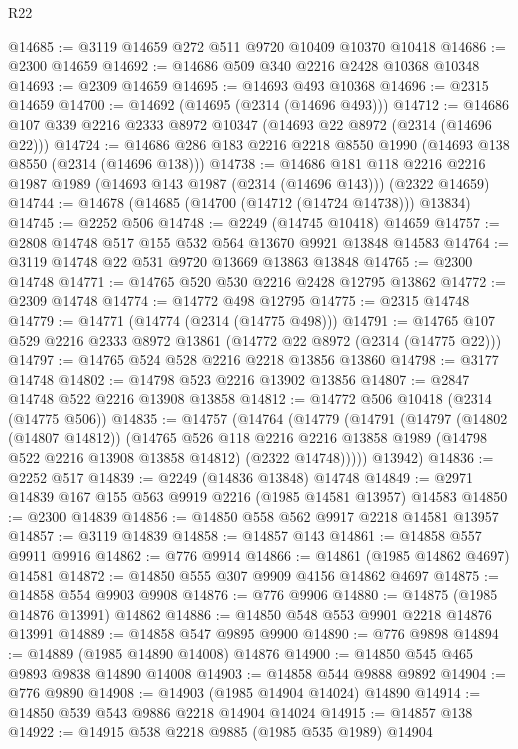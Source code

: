 \begin{lexlean}{R22}
\begin{coremodule}
@14685 := @3119 @14659 @272 @511 @9720 @10409 @10370 @10418
@14686 := @2300 @14659
@14692 := @14686 @509 @340 @2216 @2428 @10368 @10348
@14693 := @2309 @14659
@14695 := @14693 @493 @10368
@14696 := @2315 @14659
@14700 := @14692 (@14695 (@2314 (@14696 @493)))
@14712 := @14686 @107 @339 @2216 @2333 @8972 @10347 (@14693 @22 @8972 (@2314 (@14696 @22)))
@14724 := @14686 @286 @183 @2216 @2218 @8550 @1990 (@14693 @138 @8550 (@2314 (@14696 @138)))
@14738 := @14686
    @181
    @118
    @2216
    @2216
    @1987
    @1989
    (@14693 @143 @1987 (@2314 (@14696 @143)))
    (@2322 @14659)
@14744 := @14678 (@14685 (@14700 (@14712 (@14724 @14738))) @13834)
@14745 := @2252 @506
@14748 := @2249 (@14745 @10418) @14659
@14757 := @2808 @14748 @517 @155 @532 @564 @13670 @9921 @13848 @14583
@14764 := @3119 @14748 @22 @531 @9720 @13669 @13863 @13848
@14765 := @2300 @14748
@14771 := @14765 @520 @530 @2216 @2428 @12795 @13862
@14772 := @2309 @14748
@14774 := @14772 @498 @12795
@14775 := @2315 @14748
@14779 := @14771 (@14774 (@2314 (@14775 @498)))
@14791 := @14765 @107 @529 @2216 @2333 @8972 @13861 (@14772 @22 @8972 (@2314 (@14775 @22)))
@14797 := @14765 @524 @528 @2216 @2218 @13856 @13860
@14798 := @3177 @14748
@14802 := @14798 @523 @2216 @13902 @13856
@14807 := @2847 @14748 @522 @2216 @13908 @13858
@14812 := @14772 @506 @10418 (@2314 (@14775 @506))
@14835 := @14757
    (@14764
      (@14779
        (@14791
          (@14797
            (@14802 (@14807 @14812))
            (@14765
              @526
              @118
              @2216
              @2216
              @13858
              @1989
              (@14798 @522 @2216 @13908 @13858 @14812)
              (@2322 @14748)))))
      @13942)
@14836 := @2252 @517
@14839 := @2249 (@14836 @13848) @14748
@14849 := @2971 @14839 @167 @155 @563 @9919 @2216 (@1985 @14581 @13957) @14583
@14850 := @2300 @14839
@14856 := @14850 @558 @562 @9917 @2218 @14581 @13957
@14857 := @3119 @14839
@14858 := @14857 @143
@14861 := @14858 @557 @9911 @9916
@14862 := @776 @9914
@14866 := @14861 (@1985 @14862 @4697) @14581
@14872 := @14850 @555 @307 @9909 @4156 @14862 @4697
@14875 := @14858 @554 @9903 @9908
@14876 := @776 @9906
@14880 := @14875 (@1985 @14876 @13991) @14862
@14886 := @14850 @548 @553 @9901 @2218 @14876 @13991
@14889 := @14858 @547 @9895 @9900
@14890 := @776 @9898
@14894 := @14889 (@1985 @14890 @14008) @14876
@14900 := @14850 @545 @465 @9893 @9838 @14890 @14008
@14903 := @14858 @544 @9888 @9892
@14904 := @776 @9890
@14908 := @14903 (@1985 @14904 @14024) @14890
@14914 := @14850 @539 @543 @9886 @2218 @14904 @14024
@14915 := @14857 @138
@14922 := @14915 @538 @2218 @9885 (@1985 @535 @1989) @14904

\end{coremodule}
\end{lexlean}
